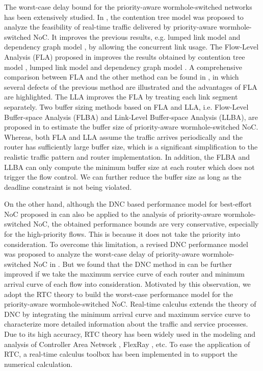 \documentclass[preprint]{elsarticle}
\begin{document}
The worst-case delay bound for the priority-aware wormhole-switched networks has been extensively studied. In \cite{LuJS05}, the contention tree model was proposed to analyze the feasibility of real-time traffic delivered by priority-aware wormhole-switched NoC. It improves the previous results, e.g. lumped link model \cite{707545} and dependency graph model \cite{708526}, by allowing the concurrent link usage. The Flow-Level Analysis (FLA) proposed in \cite{Shi:2008:RCA:1397757.1397996} improves the results obtained by contention tree model \cite{LuJS05}, lumped link model \cite{707545} and dependency graph model \cite{708526}. A comprehensive comparison between FLA and the other method can be found in \cite{Shi2009}, in which several defects of the previous method are illustrated and the advantages of FLA are highlighted. The LLA \cite{73} improves the FLA by treating each link segment separately. Two buffer sizing methods based on FLA and LLA, i.e. Flow-Level Buffer-space Analysis (FLBA) and Link-Level Buffer-space Analysis (LLBA), are proposed in \cite{189} to estimate the buffer size of priority-aware wormhole-switched NoC. Whereas, both FLA and LLA assume the traffic arrives periodically and the router has sufficiently large buffer size, which is a significant simplification to the realistic traffic pattern and router implementation. In addition, the FLBA and LLBA can only compute the minimum buffer size at each router which does not trigger the flow control. We can further reduce the buffer size as long as the deadline constraint is not being violated.

On the other hand, although the DNC based performance model for best-effort NoC proposed in \cite{qian2009analysis} can also be applied to the analysis of priority-aware wormhole-switched NoC, the obtained performance bounds are very conservative, especially for the high-priority flows. This is because it does not take the priority into consideration. To overcome this limitation, a revised DNC performance model was proposed to analyze the worst-case delay of priority-aware wormhole-switched NoC in \cite{Qian489900}. But we found that the DNC method in \cite{Qian489900} can be further improved if we take the maximum service curve of each router and minimum arrival curve of each flow into consideration. Motivated by this observation, we adopt the RTC theory \cite{1253607} to build the worst-case performance model for the priority-aware wormhole-switched NoC. Real-time calculus extends the theory of DNC \cite{Boudec2001Network} by integrating the minimum arrival curve and maximum service curve to characterize more detailed information about the traffic and service processes. Due to its high accuracy, RTC theory has been widely used in the modeling and analysis of Controller Area Network \cite{4617308}, FlexRay \cite{Hagiescu:2007:PAF:1278480.1278554}, etc. To ease the application of RTC, a real-time calculus toolbox has been implemented in \cite{rtc} to support the numerical calculation.
\end{document}
